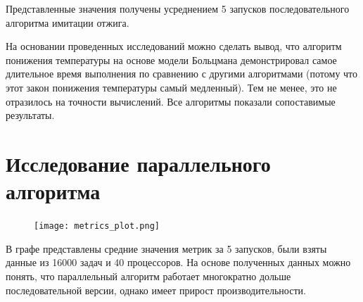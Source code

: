 \documentclass[openany, twoside, a4paper, 12pt]{extbook}
\begin{document}
Представленные значения получены усреднением 5 запусков последовательного алгоритма имитации отжига.

На основании проведенных исследований можно сделать вывод, что алгоритм понижения температуры на основе модели Больцмана демонстрировал самое длительное время выполнения по сравнению с другими алгоритмами (потому что этот закон понижения температуры самый медленный). Тем не менее, это не отразилось на точности вычислений. Все алгоритмы показали сопоставимые результаты.

\newpage
\section*{Исследование параллельного алгоритма}
\begin{figure}[h]
    \centering
    \texttt{[image: metrics\_plot.png]}
    \label{fig:image7}
\end{figure}

В графе представлены средние значения метрик за 5 запусков, были взяты данные из 16000 задач и 40 процессоров. На основе полученных данных можно понять, что параллельный алгоритм работает многократно дольше последовательной версии, однако имеет прирост производительности.
\end{document}
